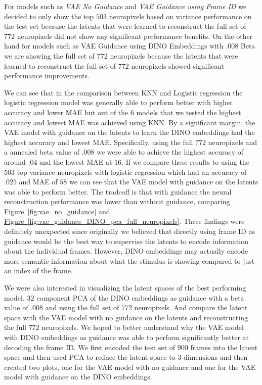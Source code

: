 \documentclass[12pt, letterpaper]{article}
\begin{document}
For models such as \textit{VAE No Guidance} and \textit{VAE Guidance using Frame ID} we decided to only show the top $503$ neuropixels based on variance performance on the test set because the latents that were learned to reconstruct the full set of $772$ neuropixels did not show any significant performance benefits. On the other hand for models such as VAE Guidance using DINO Embeddings with .008 Beta we are showing the full set of $772$ neuropixels because the latents that were learned to reconstruct the full set of $772$ neuropixels showed significant performance improvements.

We can see that in the comparison between KNN and Logistic regression the logistic regression model was generally able to perform better with higher accuracy and lower MAE but out of the $6$ models that we tested the highest accuracy and lowest MAE was achieved using KNN. By a significant margin, the VAE model with guidance on the latents to learn the DINO \cite{dino} embeddings had the highest accuracy and lowest MAE. Specifically, using the full $772$ neuropixels and a annealed beta value of $.008$ we were able to achieve the highest accuracy of around $.04$ and the lowest MAE at $16$. If we compare these results to using the $503$ top variance neuropixels with logistic regression which had an accuracy of $.025$ and MAE of $58$ we can see that the VAE model with guidance on the latents was able to perform better. The tradeoff is that with guidance the neural reconstruction performance was lower than without guidance, comparing \hyperref[fig:vae_no_guidance]{Figure~\ref{fig:vae_no_guidance}} and \hyperref[fig:vae_guidance_DINO_pca_full_neuropixels]{Figure~\ref{fig:vae_guidance_DINO_pca_full_neuropixels}}. These findings were definitely unexpected since originally we believed that directly using frame ID as guidance would be the best way to supervise the latents to encode information about the individual frames. However, DINO \cite{dino} embeddings may actually encode more semantic information about what the stimulus is showing compared to just an index of the frame. 

We were also interested in visualizing the latent spaces of the best performing model, $32$ component PCA of the DINO \cite{dino} embeddings as guidance with a beta value of $.008$ and using the full set of $772$ neuropixels. And compare the latent space with the VAE model with no guidance on the latents and reconstructing the full $772$ neuropixels. We hoped to better understand why the VAE model with DINO \cite{dino} embeddings as guidance was able to perform significantly better at decoding the frame ID. We first encoded the test set of $900$ frames into the latent space and then used PCA to reduce the latent space to $3$ dimensions and then created two plots, one for the VAE model with no guidance and one for the VAE model with guidance on the DINO \cite{dino} embeddings.
\end{document}

